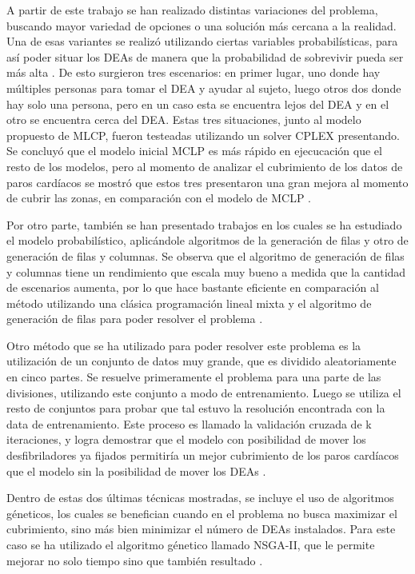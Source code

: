 \documentclass[letter, 10pt]{article}
\begin{document}
A partir de este trabajo se han realizado distintas variaciones del problema, buscando mayor variedad de opciones o una soluci\'on m\'as cercana a la realidad. Una de esas variantes se realiz\'o utilizando ciertas variables probabil\'isticas, para as\'i poder situar los DEAs de manera que la probabilidad de sobrevivir pueda ser m\'as alta \cite{ChanDemir}. De esto surgieron tres escenarios: en primer lugar, uno donde hay m\'ultiples personas para tomar el DEA y ayudar al sujeto, luego otros dos donde hay solo una persona, pero en un caso esta se encuentra lejos del DEA y en el otro se encuentra cerca del DEA. Estas tres situaciones, junto al modelo propuesto de MLCP, fueron testeadas utilizando un solver CPLEX presentando. Se concluy\'o que el modelo inicial MCLP es m\'as r\'apido en ejecucaci\'on que el resto de los modelos, pero al momento de analizar el cubrimiento de los datos de paros card\'iacos se mostr\'o que estos tres presentaron una gran mejora al momento de cubrir las zonas, en comparaci\'on con el modelo de MCLP \cite{ChanDemir}.

Por otro parte, tambi\'en se han presentado trabajos en los cuales se ha estudiado el modelo probabil\'istico, aplic\'andole algoritmos de la generaci\'on de filas y otro de generaci\'on de filas y columnas. Se observa que el algoritmo de generaci\'on de filas y columnas tiene un rendimiento que escala muy bueno a medida que la cantidad de escenarios aumenta, por lo que hace bastante eficiente en comparaci\'on al m\'etodo utilizando una cl\'asica programaci\'on lineal mixta y el algoritmo de generaci\'on de filas para poder resolver el problema \cite{Chan3}.

Otro m\'etodo que se ha utilizado para poder resolver este problema es la utilizaci\'on de un conjunto de datos muy grande, que es dividido aleatoriamente en cinco partes. Se resuelve primeramente el problema para una parte de las divisiones, utilizando este conjunto a modo de entrenamiento. Luego se utiliza el resto de conjuntos para probar que tal estuvo la resoluci\'on encontrada con la data de entrenamiento. Este proceso es llamado la validaci\'on cruzada de k iteraciones, y logra demostrar que el modelo con posibilidad de mover los desfibriladores ya fijados permitir\'ia un mejor cubrimiento de los paros card\'iacos que el modelo sin la posibilidad de mover los DEAs \cite{Tierney}.

Dentro de estas dos \'ultimas t\'ecnicas mostradas, se incluye el uso de algoritmos g\'eneticos, los cuales se benefician cuando en el problema no busca maximizar el cubrimiento, sino m\'as bien minimizar el n\'umero de DEAs instalados. Para este caso se ha utilizado el algoritmo g\'enetico  llamado NSGA-II, que le permite mejorar no solo tiempo sino que tambi\'en resultado \cite{Bonnet}.
\end{document}
